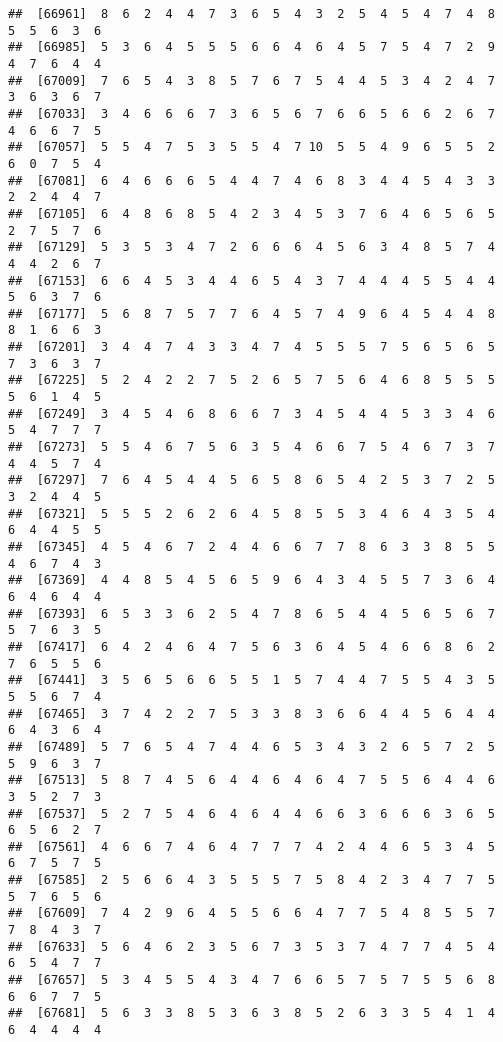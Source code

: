 \documentclass[
]{book}
\begin{document}
\begin{verbatim}
##  [66961]  8  6  2  4  4  7  3  6  5  4  3  2  5  4  5  4  7  4  8  5  5  6  3  6
##  [66985]  5  3  6  4  5  5  5  6  6  4  6  4  5  7  5  4  7  2  9  4  7  6  4  4
##  [67009]  7  6  5  4  3  8  5  7  6  7  5  4  4  5  3  4  2  4  7  3  6  3  6  7
##  [67033]  3  4  6  6  6  7  3  6  5  6  7  6  6  5  6  6  2  6  7  4  6  6  7  5
##  [67057]  5  5  4  7  5  3  5  5  4  7 10  5  5  4  9  6  5  5  2  6  0  7  5  4
##  [67081]  6  4  6  6  6  5  4  4  7  4  6  8  3  4  4  5  4  3  3  2  2  4  4  7
##  [67105]  6  4  8  6  8  5  4  2  3  4  5  3  7  6  4  6  5  6  5  2  7  5  7  6
##  [67129]  5  3  5  3  4  7  2  6  6  6  4  5  6  3  4  8  5  7  4  4  4  2  6  7
##  [67153]  6  6  4  5  3  4  4  6  5  4  3  7  4  4  4  5  5  4  4  5  6  3  7  6
##  [67177]  5  6  8  7  5  7  7  6  4  5  7  4  9  6  4  5  4  4  8  8  1  6  6  3
##  [67201]  3  4  4  7  4  3  3  4  7  4  5  5  5  7  5  6  5  6  5  7  3  6  3  7
##  [67225]  5  2  4  2  2  7  5  2  6  5  7  5  6  4  6  8  5  5  5  5  6  1  4  5
##  [67249]  3  4  5  4  6  8  6  6  7  3  4  5  4  4  5  3  3  4  6  5  4  7  7  7
##  [67273]  5  5  4  6  7  5  6  3  5  4  6  6  7  5  4  6  7  3  7  4  4  5  7  4
##  [67297]  7  6  4  5  4  4  5  6  5  8  6  5  4  2  5  3  7  2  5  3  2  4  4  5
##  [67321]  5  5  5  2  6  2  6  4  5  8  5  5  3  4  6  4  3  5  4  6  4  4  5  5
##  [67345]  4  5  4  6  7  2  4  4  6  6  7  7  8  6  3  3  8  5  5  4  6  7  4  3
##  [67369]  4  4  8  5  4  5  6  5  9  6  4  3  4  5  5  7  3  6  4  6  4  6  4  4
##  [67393]  6  5  3  3  6  2  5  4  7  8  6  5  4  4  5  6  5  6  7  5  7  6  3  5
##  [67417]  6  4  2  4  6  4  7  5  6  3  6  4  5  4  6  6  8  6  2  7  6  5  5  6
##  [67441]  3  5  6  5  6  6  5  5  1  5  7  4  4  7  5  5  4  3  5  5  5  6  7  4
##  [67465]  3  7  4  2  2  7  5  3  3  8  3  6  6  4  4  5  6  4  4  6  4  3  6  4
##  [67489]  5  7  6  5  4  7  4  4  6  5  3  4  3  2  6  5  7  2  5  5  9  6  3  7
##  [67513]  5  8  7  4  5  6  4  4  6  4  6  4  7  5  5  6  4  4  6  3  5  2  7  3
##  [67537]  5  2  7  5  4  6  4  6  4  4  6  6  3  6  6  6  3  6  5  6  5  6  2  7
##  [67561]  4  6  6  7  4  6  4  7  7  7  4  2  4  4  6  5  3  4  5  6  7  5  7  5
##  [67585]  2  5  6  6  4  3  5  5  5  7  5  8  4  2  3  4  7  7  5  5  7  6  5  6
##  [67609]  7  4  2  9  6  4  5  5  6  6  4  7  7  5  4  8  5  5  7  7  8  4  3  7
##  [67633]  5  6  4  6  2  3  5  6  7  3  5  3  7  4  7  7  4  5  4  6  5  4  7  7
##  [67657]  5  3  4  5  5  4  3  4  7  6  6  5  7  5  7  5  5  6  8  6  6  7  7  5
##  [67681]  5  6  3  3  8  5  3  6  3  8  5  2  6  3  3  5  4  1  4  6  4  4  4  4

\end{verbatim}
\end{document}
